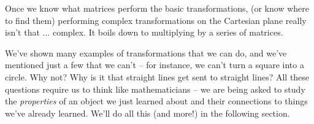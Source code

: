 \medskip

Once we know what matrices perform the basic transformations, (or know where to find them) performing complex transformations on the Cartesian plane really isn't that $\ldots$ complex. It boils down to multiplying by a series of matrices. 

We've shown many examples of transformations that we can do, and we've mentioned just a few that we can't -- for instance, we can't turn a square into a circle. Why not? Why is it that straight lines get sent to straight lines? 
All these questions require us to think like mathematicians -- we are being asked to study the \textit{properties} of an object we just learned about and their connections to things we've already learned. We'll do all this (and more!) in the following section.\\




